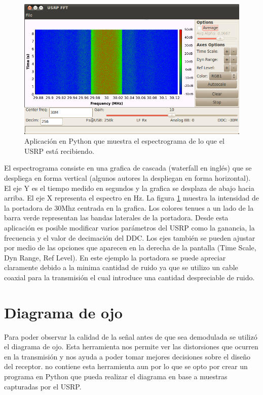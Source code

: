 \begin{figure}[htp]
  \centering
  \includegraphics[scale=0.7]{figs/spectrogramgui}
  \vspace{0.3in}
  \caption{Aplicaci\'on en Python que muestra el espectrograma de lo que el USRP est\'a recibiendo.}
  \label{fig:spectrogramgui}
\end{figure}

El espectrograma consiste en una grafica de cascada (waterfall en ingl\'es) que se despliega en
forma vertical (algunos autores la despliegan en forma horizontal). El eje Y es el tiempo medido en
segundos y la grafica se desplaza de abajo hacia arriba. El eje X representa el espectro en Hz. La
figura \ref{fig:spectrogramgui} muestra la intensidad de la portadora de 30Mhz centrada en la
grafica. Los colores tenues a un lado de la barra verde representan las bandas laterales de la
portadora. Desde esta aplicaci\'on es posible modificar varios par\'ametros del USRP como la
ganancia, la frecuencia y el valor de decimaci\'on del DDC. Los ejes tambi\'en se pueden ajustar por
medio de las opciones que aparecen en la derecha de la pantalla (Time Scale, Dyn Range, Ref Level).
En este ejemplo la portadora se puede apreciar claramente debido a la minima cantidad de ruido ya que se
utilizo un cable coaxial para la transmisi\'on el cual introduce una cantidad despreciable de ruido.
\section{Diagrama de ojo}

Para poder observar la calidad de la se\~nal antes de que sea demodulada se utiliz\'o el diagrama de
ojo. Esta herramienta nos permite ver las distorsiones que ocurren en la transmisi\'on y nos ayuda a
poder tomar mejores decisiones sobre el dise\~no del receptor. \gnuradio no contiene esta
herramienta aun por lo que se opto por crear un programa en Python que pueda realizar el diagrama en
base a muestras capturadas por el USRP.

